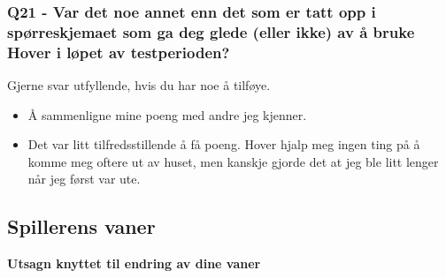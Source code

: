 \clearpage
\subsubsection*{Q21 - Var det noe annet enn det som er tatt opp i spørreskjemaet som ga deg glede (eller ikke) av å bruke Hover i løpet av testperioden?}
Gjerne svar utfyllende, hvis du har noe å tilføye.
\begin{itemize}[noitemsep]
	\item Å sammenligne mine poeng med andre jeg kjenner.
	\item Det var litt tilfredsstillende å få poeng. Hover hjalp meg ingen ting på å komme meg oftere ut av huset, men kanskje gjorde det at jeg ble litt lenger når jeg først var ute.
\end{itemize}




\newpage
\subsection*{Spillerens vaner}

\textbf{Utsagn knyttet til endring av dine vaner}

